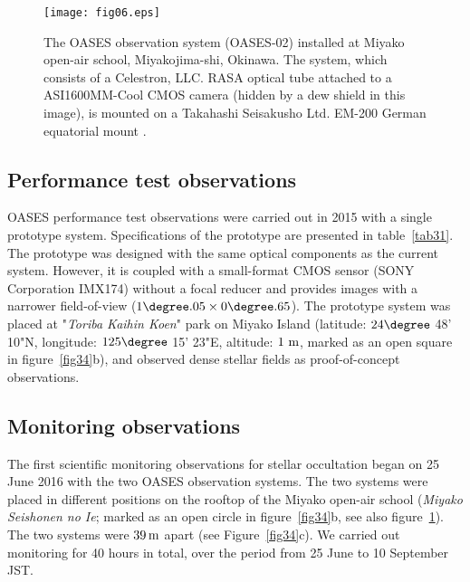\documentclass{pasj01}
\newcommand{\void}[1]{}
\renewcommand{\textcolor}{\void}
\begin{document}
\begin{figure}[!pt]
\begin{center}
\texttt{[image: fig06.eps]}
\caption{The OASES observation system (OASES-02) 
installed at Miyako open-air school, 
Miyakojima-shi, Okinawa.
The system, which consists of a Celestron, LLC. RASA optical tube 
attached to a ASI1600MM-Cool CMOS camera 
(hidden by a dew shield in this image), 
is mounted on a Takahashi Seisakusho Ltd. EM-200 German equatorial mount .}
\label{fig41}
\end{center}
\end{figure}

\subsection{Performance test observations}
\label{subsec:test}
OASES performance test observations were carried out in 2015 
with a single prototype system.
Specifications of the prototype are presented in table~\ref{tab31}.
The prototype was designed with the same optical components as the current system.
However, it is coupled with a small-format CMOS sensor (SONY Corporation IMX174) without a focal reducer
and provides images with a narrower field-of-view ($1\degree .05 \times 0\degree .65$).
The prototype system was placed at "{\it Toriba Kaihin Koen}" park on Miyako Island
(latitude: $24\degree$ 48' 10"N, longitude: $125\degree$ 15' 23"E, altitude: $1 \ {\rm m}$, 
marked as an open square in figure~\ref{fig34}b),
and observed dense stellar fields as proof-of-concept observations.


\subsection{Monitoring observations}
\label{subsec:obs}
The first scientific monitoring observations for stellar occultation began on 25 June 2016 
with the two OASES observation systems.
The two systems were placed in 
different positions on the rooftop of the Miyako open-air school %
\textcolor{red}{
({\it Miyako Seishonen no Ie};
}
marked as an open circle in figure~\ref{fig34}b, see also figure~\ref{fig41}).
The two systems were $39 \, {\rm m}$ apart (see Figure~\ref{fig34}c).
We carried out monitoring for 40 hours in total,
over the period from 25 June to 10 September JST.
\end{document}
